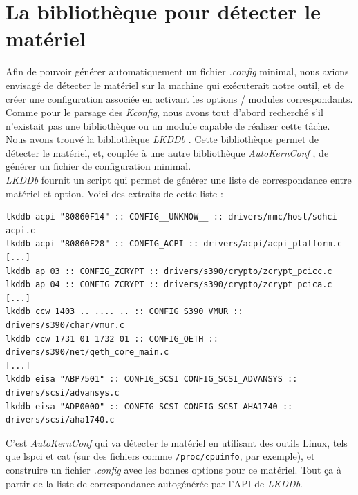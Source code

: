 \documentclass[17pts]{report}
\begin{document}
\section{La bibliothèque pour détecter le matériel}
\label{sec:La bibliothèque pour détecter le matériel}
Afin de pouvoir générer automatiquement un fichier \textit{.config} minimal,
nous avions envisagé de détecter le matériel sur la machine qui exécuterait
notre outil, et de créer une configuration associée en activant les options /
modules correspondants. Comme pour le parsage des \textit{Kconfig}, nous avons
tout d'abord recherché s'il n'existait pas une bibliothèque ou un module
capable de réaliser cette tâche. Nous avons trouvé la bibliothèque
\textit{LKDDb} \cite{Existant:lib:lkddb}. Cette bibliothèque permet de détecter
le matériel, et, couplée à une autre bibliothèque \textit{AutoKernConf}
\cite{Existant:lib:autoKernConf}, de générer un fichier de configuration
minimal. \\

\textit{LKDDb} fournit un script qui permet de générer une liste de
correspondance entre matériel et option. Voici des extraits de cette liste : \\

\begin{verbatim}
lkddb acpi "80860F14" :: CONFIG__UNKNOW__ :: drivers/mmc/host/sdhci-acpi.c
lkddb acpi "80860F28" :: CONFIG_ACPI :: drivers/acpi/acpi_platform.c
[...]
lkddb ap 03 :: CONFIG_ZCRYPT :: drivers/s390/crypto/zcrypt_pcicc.c
lkddb ap 04 :: CONFIG_ZCRYPT :: drivers/s390/crypto/zcrypt_pcica.c
[...]
lkddb ccw 1403 .. .... .. :: CONFIG_S390_VMUR :: drivers/s390/char/vmur.c
lkddb ccw 1731 01 1732 01 :: CONFIG_QETH :: drivers/s390/net/qeth_core_main.c
[...]
lkddb eisa "ABP7501" :: CONFIG_SCSI CONFIG_SCSI_ADVANSYS :: drivers/scsi/advansys.c
lkddb eisa "ADP0000" :: CONFIG_SCSI CONFIG_SCSI_AHA1740 :: drivers/scsi/aha1740.c
\end{verbatim}

C'est \textit{AutoKernConf} qui va détecter le matériel en utilisant des outils
Linux, tels que lspci et cat (sur des fichiers comme \verb|/proc/cpuinfo|, par
exemple), et construire un fichier \textit{.config} avec les bonnes options pour
ce matériel. Tout ça à partir de la liste de correspondance autogénérée par
l'API de \textit{LKDDb}. \\
\end{document}
